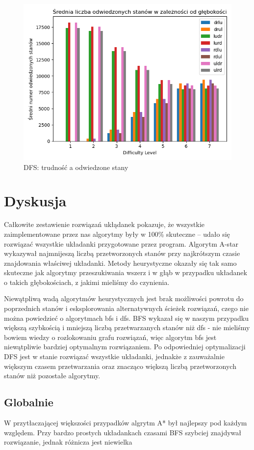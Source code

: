 \documentclass{classrep}
\begin{document}
\begin{figure}[p] \centering
 \includegraphics[width=0.9\linewidth]{./pic/dfs_vstd_c_vs_diff.png}
 \caption{DFS: trudność a odwiedzone stany}
\end{figure}

\section{Dyskusja}
Całkowite zestawienie rozwiązań ukłądanek pokazuje, że wszystkie zaimplementowane przez nas algorytmy były w 100\% skuteczne -- udało się rozwiązać wszystkie układanki przygotowane 
przez program. Algorytm A-star wykazywał najmnijeszą liczbą przetworzonych stanów przy najkrótszym czasie znajdowania właściwej układanki. Metody heurystyczne okazały się tak samo
skuteczne jak algorytmy przeszukiwania wszerz i w głąb w przypadku układanek o takich głębokościach, z jakimi mieliśmy do czynienia. 

Niewątpliwą wadą algorytmów heurystycznych jest brak możliwości powrotu do poprzednich stanów i esksplorowania alternatywnych ścieżek rozwiązań, czego nie można powiedzieć o algorytmach bfs i dfs. BFS wykazał się w naszym przypadku większą szybkością i mniejszą liczbą przetwarzanych stanów niż dfs - nie mieliśmy bowiem wiedzy o rozlokowaniu grafu rozwiązań, więc algorytm bfs jest niewątpliwie bardziej optymalnym rozwiązaniem. Po odpowiedniej optymalizacji DFS jest w stanie rozwiązać wszystkie układanki, jednakże z zauważalnie większym czasem przetwarzania oraz znacząco większą liczbą przetworzonych stanów niż pozostałe algorytmy.

\subsection{Globalnie}
W przytłaczającej większości przypadków algrytm A* był najlepszy pod każdym względem.
Przy bardzo prostych układankach czasami BFS szybciej znajdywał rozwiązanie, jednak różnicza jest niewielka
\end{document}
